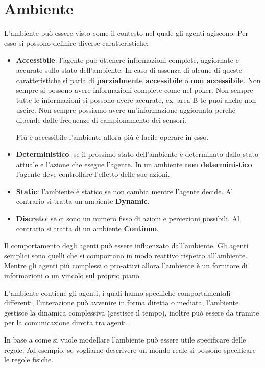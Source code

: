 \section{Ambiente}
L'ambiente può essere visto come il contesto nel quale gli agenti agiscono. Per
esso si possono definire diverse caratteristiche:
\begin{itemize}
    \item \textbf{Accessibile}: l'agente può ottenere informazioni complete,
          aggiornate e accurate sullo stato dell'ambiente. In caso di assenza di
          alcune di queste caratteristiche si parla di \textbf{parzialmente
              accessibile} o \textbf{non accessibile}.
          Non sempre si possono avere informazioni complete come nel poker.
          Non sempre tutte le informazioni si possono avere accurate, ex: area
          B te puoi anche non uscire. Non sempre possiamo avere un'informazione
          aggiornata perché dipende dalle frequenze di campionamento dei sensori.

          Più è accessibile l'ambiente allora più è facile operare in esso.
    \item \textbf{Deterministico}: se il prossimo stato dell'ambiente è determinato
    dallo stato attuale e l'azione che esegue l'agente. In un ambiente \textbf{non deterministico}
          l'agente deve controllare l'effetto delle sue azioni.
    \item \textbf{Static}: l'ambiente è statico se non cambia mentre
          l'agente decide. Al contrario si tratta un ambiente \textbf{Dynamic}.
    \item \textbf{Discreto}: se ci sono un numero fisso di azioni e percezioni
          possibili. Al contrario si tratta di un ambiente \textbf{Continuo}.
\end{itemize}

Il comportamento degli agenti può essere influenzato dall'ambiente. Gli agenti
semplici sono quelli che si comportano in modo reattivo rispetto all'ambiente.
Mentre gli agenti più complessi o pro-attivi allora l'ambiente è un fornitore di
informazioni o un vincolo sul proprio piano.

L'ambiente contiene gli agenti, i quali hanno specifiche comportamentali
differenti, l'interazione può avvenire in forma diretta o mediata, l'ambiente
gestisce la dinamica complessiva (gestisce il tempo), inoltre può essere da
tramite per la comunicazione diretta tra agenti.

In base a come si vuole modellare l'ambiente può essere utile specificare delle
regole. Ad esempio, se vogliamo descrivere un mondo reale si possono specificare
le regole fisiche.

